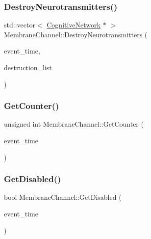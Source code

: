 \mbox{\label{classMembraneChannel_ad5dfc13b89aff0c7383e052113da1d8f}} 
\subsubsection{\texorpdfstring{Destroy\+Neurotransmitters()}{DestroyNeurotransmitters()}}
{\footnotesize\ttfamily std\+::vector$<$ \mbox{\hyperlink{classCognitiveNetwork}{Cognitive\+Network}} $\ast$ $>$ Membrane\+Channel\+::\+Destroy\+Neurotransmitters (\begin{DoxyParamCaption}\item[{std\+::chrono\+::time\+\_\+point$<$ \mbox{\hyperlink{universe_8h_a0ef8d951d1ca5ab3cfaf7ab4c7a6fd80}{Clock}} $>$}]{event\+\_\+time,  }\item[{std\+::vector$<$ \mbox{\hyperlink{classCognitiveNetwork}{Cognitive\+Network}} $\ast$$>$}]{destruction\+\_\+list }\end{DoxyParamCaption})}

\mbox{\label{classMembraneChannel_ac856b74d47b28bd8638fce9c0f12dd20}} 
\subsubsection{\texorpdfstring{Get\+Counter()}{GetCounter()}}
{\footnotesize\ttfamily unsigned int Membrane\+Channel\+::\+Get\+Counter (\begin{DoxyParamCaption}\item[{std\+::chrono\+::time\+\_\+point$<$ \mbox{\hyperlink{universe_8h_a0ef8d951d1ca5ab3cfaf7ab4c7a6fd80}{Clock}} $>$}]{event\+\_\+time }\end{DoxyParamCaption})\hspace{0.3cm}{\ttfamily [inline]}}

\mbox{\label{classMembraneChannel_afde030429a160621a2255ab8a2d689b8}} 
\subsubsection{\texorpdfstring{Get\+Disabled()}{GetDisabled()}}
{\footnotesize\ttfamily bool Membrane\+Channel\+::\+Get\+Disabled (\begin{DoxyParamCaption}\item[{std\+::chrono\+::time\+\_\+point$<$ \mbox{\hyperlink{universe_8h_a0ef8d951d1ca5ab3cfaf7ab4c7a6fd80}{Clock}} $>$}]{event\+\_\+time }\end{DoxyParamCaption})\hspace{0.3cm}{\ttfamily [inline]}}

